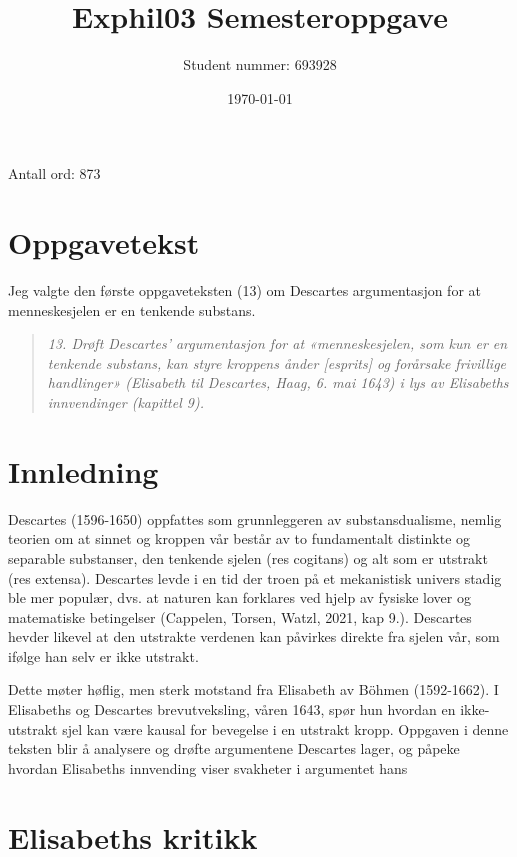 \documentclass[12pt, a4paper]{article}
\title{Exphil03 Semesteroppgave}
\author{Student nummer: 693928}
\date{\today}
\begin{document}
\maketitle

Antall ord: 873

\section{Oppgavetekst}

Jeg valgte den første oppgaveteksten (13) om Descartes argumentasjon for at menneskesjelen er en tenkende substans.

\begin{quote}
    \textit{13. Drøft Descartes’ argumentasjon for at «menneskesjelen, som kun er en tenkende substans, kan styre kroppens ånder [esprits] og forårsake frivillige handlinger» (Elisabeth til Descartes, Haag, 6. mai 1643) i lys av Elisabeths innvendinger (kapittel 9).}
\end{quote}



\section{Innledning}

Descartes (1596-1650) oppfattes som grunnleggeren av substansdualisme, nemlig teorien om at sinnet og kroppen vår består av to fundamentalt distinkte og separable substanser, den tenkende sjelen (res cogitans) og alt som er utstrakt (res extensa). Descartes levde i en tid der troen på et mekanistisk univers stadig ble mer populær, dvs. at naturen kan forklares ved hjelp av fysiske lover og matematiske betingelser (Cappelen, Torsen, Watzl, 2021, kap 9.). Descartes hevder likevel at den utstrakte verdenen kan påvirkes direkte fra sjelen vår, som ifølge han selv er ikke utstrakt. 

\medskip
Dette møter høflig, men sterk motstand fra Elisabeth av B\"{o}hmen (1592-1662). I Elisabeths og Descartes brevutveksling, våren 1643, spør hun hvordan en ikke-utstrakt sjel kan være kausal for bevegelse i en utstrakt kropp. Oppgaven i denne teksten blir å analysere og drøfte argumentene Descartes lager, og påpeke hvordan Elisabeths innvending viser svakheter i argumentet hans


\section{Elisabeths kritikk}
\end{document}
